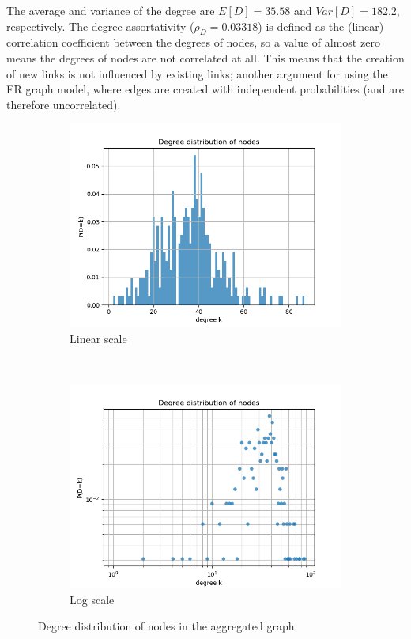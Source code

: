\documentclass[letterpaper]{article}
\begin{document}
The average and variance of the degree are \(E[D]=35.58\) and \(Var[D]=182.2\), respectively. The degree assortativity (\(\rho_D=0.03318\)) is defined as the (linear) correlation coefficient between the degrees of nodes, so a value of almost zero means the degrees of nodes are not correlated at all. This means that the creation of new links is not influenced by existing links; another argument for using the ER graph model, where edges are created with independent probabilities (and are therefore uncorrelated).

\begin{figure}
    \centering
    \begin{subfigure}[b]{0.45\textwidth}
        \includegraphics[width=\textwidth]{img/degree_distribution.png}
        \caption{Linear scale}
	    \label{fig:degree_distribution_linlin}
    \end{subfigure}
    ~ %
    \begin{subfigure}[b]{0.45\textwidth}
        \includegraphics[width=\textwidth]{img/degree_distribution_loglog.png}
        \caption{Log scale}
	    \label{fig:degree_distribution_loglog}
    \end{subfigure}
    \caption{Degree distribution of nodes in the aggregated graph.}
    \label{fig:degree_distribution}
\end{figure}
\end{document}
